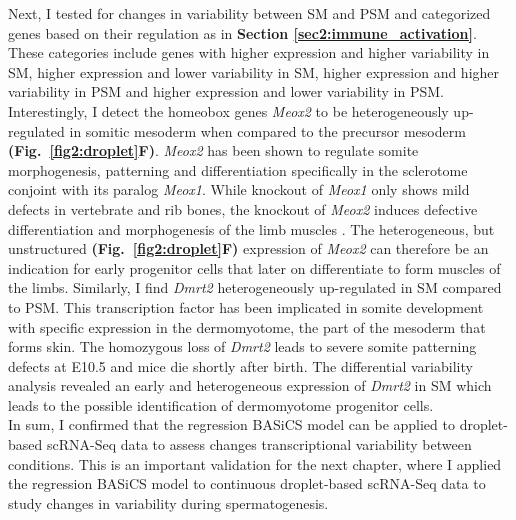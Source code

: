 Next, I tested for changes in variability between SM and PSM and categorized genes based on their regulation as in \textbf{Section \ref{sec2:immune_activation}}. These categories include genes with higher expression and higher variability in SM, higher expression and lower variability in SM, higher expression and higher variability in PSM and higher expression and lower variability in PSM. Interestingly, I detect the homeobox genes \textit{Meox2} to be heterogeneously up-regulated in somitic mesoderm when compared to the precursor mesoderm \textbf{(Fig.~\ref{fig2:droplet}F)}. \textit{Meox2} has been shown to regulate somite morphogenesis, patterning and differentiation specifically in the sclerotome conjoint with its paralog \textit{Meox1}. While knockout of \textit{Meox1} only shows mild defects in vertebrate and rib bones, the knockout of \textit{Meox2} induces defective differentiation and morphogenesis of the limb muscles \cite{Mankoo2003}. The heterogeneous, but unstructured \textbf{(Fig.~\ref{fig2:droplet}F)} expression of \textit{Meox2} can therefore be an indication for early progenitor cells that later on differentiate to form  muscles of the limbs. Similarly, I find \textit{Dmrt2} heterogeneously up-regulated in SM compared to PSM. This transcription factor has been implicated in somite development with specific expression in the dermomyotome, the part of the mesoderm that forms skin. The homozygous loss of \textit{Dmrt2} leads to severe somite patterning defects at E10.5 and mice die shortly after birth\citep{Seo2006}. The differential variability analysis revealed an early and heterogeneous expression of \textit{Dmrt2} in SM which leads to the possible identification of dermomyotome progenitor cells.\\

In sum, I confirmed that the regression BASiCS model can be applied to droplet-based scRNA-Seq data to assess changes transcriptional variability between conditions. This is an important validation for the next chapter, where I applied the regression BASiCS model to continuous droplet-based scRNA-Seq data to study changes in variability during spermatogenesis. 
